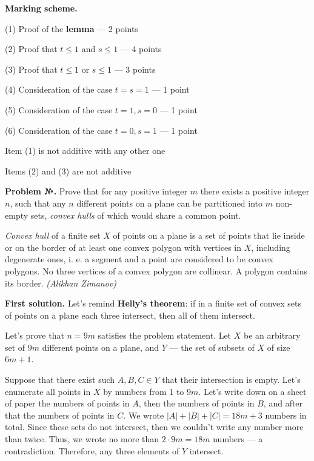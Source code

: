 \documentclass[12pt]{article}
\newcounter{problem}
\newcommand{\z}{\par  \smallskip \noindent \refstepcounter{problem}%
\textbf{Problem №\arabic{problem}.} }
\def\solI{\noindent \textbf{First solution. }}
\begin{document}
\bigskip

\textbf{Marking scheme.}
\begin{compactitem}
\item (1) Proof of the \textbf{lemma} --- 2 points
\item (2) Proof that $t \leq 1$ and $s \leq 1$ --- 4 points
\item (3) Proof that $t \leq 1$ or $s \leq 1$ --- 3 points
\item (4) Consideration of the case $t = s = 1$ --- 1 point
\item (5) Consideration of the case $t = 1, s = 0$ --- 1 point
\item (6) Consideration of the case $t = 0, s = 1$ --- 1 point
\item Item (1) is not additive with any other one
\item Items (2) and (3) are not additive
\end{compactitem}

\bigskip

\z Prove that for any positive integer $m$ there exists a positive integer $n$, such that any $n$ different points on a plane can be partitioned into $m$ non-empty sets, \textit{convex hulls} of which would share a common point.

\textit{Convex hull} of a finite set $X$ of points on a plane is a set of points that lie inside or on the border of at least one convex polygon with vertices in $X$, including degenerate ones, i. e. a segment and a point are considered to be convex polygons. No three vertices of a convex polygon are collinear. A polygon contains its border. \textit{(Alikhan Zimanov)}

\bigskip

\solI Let's remind \textbf{Helly's theorem}: if in a finite set of convex sets of points on a plane each three intersect, then all of them intersect.

Let's prove that $n = 9m$ satisfies the problem statement. Let $X$ be an arbitrary set of $9m$ different points on a plane, and $Y$ --- the set of subsets of $X$ of size $6m + 1$. 

Suppose that there exist such $A, B, C \in Y$ that their intersection is empty. Let's enumerate all points in $X$ by numbers from 1 to $9m$. Let's write down on a sheet of paper the numbers of points in $A$, then the numbers of points in $B$, and after that the numbers of points in $C$. We wrote $|A| + |B| + |C| = 18m + 3$ numbers in total. Since these sets do not intersect, then we couldn't write any number more than twice. Thus, we wrote no more than $2 \cdot 9m = 18m$ numbers --- a contradiction. Therefore, any three elements of $Y$ intersect.
\end{document}
